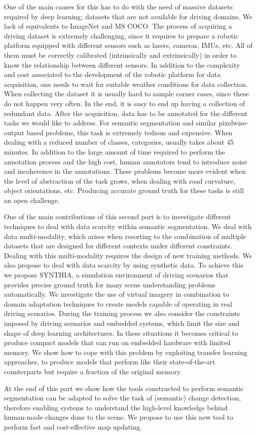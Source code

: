 One of the main causes for this has to do with the need of massive datasets required by deep learning; datasets that are not available for driving domains. We lack of equivalents to ImageNet and MS COCO. The process of acquiring a driving dataset is extremely challenging, since it requires to prepare a robotic platform equipped with different sensors such as lasers, cameras, IMUs, etc. All of them must be correctly calibrated (intrinsically and extrinsically) in order to know the relationship between different sensors. In addition to the complexity and cost associated to the development of the robotic platform for data acquisition, one needs to wait for suitable weather conditions for data collection. When collecting the dataset it is usually hard to sample corner cases, since these do not happen very often. In the end, it is easy to end up having a collection of redundant data. After the acquisition, data has to be annotated for the different tasks we would like to address. For semantic segmentation and similar pixelwise-output based problems, this task is extremely tedious and expensive. When dealing with a reduced number of classes,  categories, usually takes about 45 minutes. In addition to the large amount of time required to perform the annotation process and the high cost, human annotators tend to introduce noise and incoherence in the annotations. These problems become more evident when the level of abstraction of the task grows, \eg when dealing with road curvature, object orientations, etc. Producing accurate ground truth for these tasks is still an open challenge.

One of the main contributions of this second part is to investigate different techniques to deal with data scarcity within semantic segmentation. We deal with data multi-modality, which arises when resorting to the combination of multiple datasets that are designed for different contexts under different constraints. Dealing with this multi-modality requires the design of new training methods. We also propose to deal with data scarcity by using synthetic data. To achieve this we propose SYNTHIA, a simulation environment of driving scenarios that provides precise ground truth for many scene understanding problems automatically. We investigate the use of virtual imagery in combination to domain adaptation techniques to create models capable of operating in real driving scenarios. During the training process we also consider the constraints imposed by driving scenarios and embedded systems, which limit the size and shape of deep learning architectures. In these situations it becomes critical to produce compact models that can run on embedded hardware with limited memory. We show how to cope with this problem by exploiting transfer learning approaches, to produce models that perform like their state-of-the-art counterparts but require a fraction of the original memory.

At the end of this part we show how the tools constructed to perform semantic segmentation can be adapted to solve the task of (semantic) change detection, therefore enabling systems to understand the high-level knowledge behind human-made changes done to the scene. We propose to use this new tool to perform fast and cost-effective map updating.
